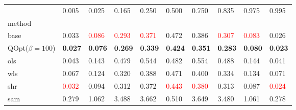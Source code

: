 \begin{tabular}{llllllllll}
\toprule
 & 0.005 & 0.025 & 0.165 & 0.250 & 0.500 & 0.750 & 0.835 & 0.975 & 0.995 \\
method &  &  &  &  &  &  &  &  &  \\
\midrule
base & 0.033 & \textcolor{red}{0.086} & \textcolor{red}{0.293} & \textcolor{red}{0.371} & 0.472 & 0.386 & \textcolor{red}{0.307} & \textcolor{red}{0.083} & 0.026 \\
\midrule
QOpt($\beta=100$) & \textbf{0.027} & \textbf{0.076} & \textbf{0.269} & \textbf{0.339} & \textbf{0.424} & \textbf{0.351} & \textbf{0.283} & \textbf{0.080} & \textbf{0.023} \\
ols & 0.043 & 0.143 & 0.479 & 0.544 & 0.482 & 0.554 & 0.488 & 0.144 & 0.041 \\
wls & 0.067 & 0.124 & 0.320 & 0.388 & 0.471 & 0.400 & 0.334 & 0.134 & 0.071 \\
shr & \textcolor{red}{0.032} & 0.094 & 0.312 & 0.372 & \textcolor{red}{0.443} & \textcolor{red}{0.380} & 0.313 & 0.087 & \textcolor{red}{0.024} \\
sam & 0.279 & 1.062 & 3.488 & 3.662 & 0.510 & 3.649 & 3.480 & 1.061 & 0.278 \\
\bottomrule
\end{tabular}